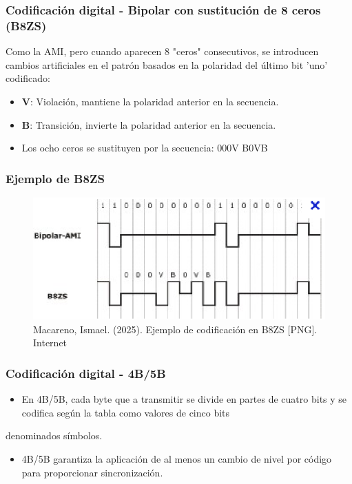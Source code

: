 \documentclass[11pt]{article}
\begin{document}
\subsubsection{Codificación digital - Bipolar con sustitución de 8 ceros (B8ZS)}
\label{sec:org82c9c8f}
Como la AMI, pero cuando aparecen 8 "ceros" consecutivos, se introducen cambios artificiales en el patrón basados en la polaridad del
último bit 'uno' codificado:
\begin{itemize}
\item \textbf{V}: Violación, mantiene la polaridad anterior en la secuencia.
\item \textbf{B}: Transición, invierte la polaridad anterior en la secuencia.
\item Los ocho ceros se sustituyen por la secuencia: 000V B0VB
\end{itemize}
\subsubsection{Ejemplo de B8ZS}
\label{sec:org308470b}
\begin{figure}[htbp]
\centering
\includegraphics[width=.9\linewidth]{../apuntes/img/ejemplo-codificacion-b8zs.png}
\caption{Macareno, Ismael. (2025). Ejemplo de codificación en B8ZS [PNG]. Internet}
\end{figure}
\subsubsection{Codificación digital - 4B/5B}
\label{sec:orge115dde}
\begin{itemize}
\item En 4B/5B, cada byte que a transmitir se divide en partes de cuatro bits y se codifica según la tabla como valores de cinco bits
\end{itemize}
denominados símbolos.

\begin{itemize}
\item 4B/5B garantiza la aplicación de al menos un cambio de nivel por código para proporcionar sincronización.
\end{itemize}
\end{document}
